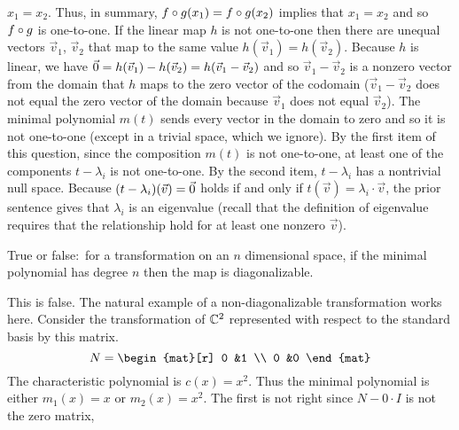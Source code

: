 \begin{exercises}
\begin{answer}
\begin{exparts}
          $x_1=x_2$.
          Thus, in summary, $f\mathbin{\circ} g(x_1)=f\mathbin{\circ} g(x_2)$
          implies that $x_1=x_2$ and so $f\mathbin{\circ} g$ is one-to-one.
        \partsitem If the linear map $h$ 
          is not one-to-one then there are unequal
          vectors $\vec{v}_1$, $\vec{v}_2$ that map to the same value
          $h(\vec{v}_1)=h(\vec{v}_2)$.
          Because $h$ is linear, we have
          $\vec{0}=h(\vec{v}_1)-h(\vec{v}_2)=h(\vec{v}_1-\vec{v}_2)$
          and so $\vec{v}_1-\vec{v}_2$ is a nonzero vector from the domain
          that $h$ maps to the zero vector of the codomain  
          ($\vec{v}_1-\vec{v}_2$
          does not equal the zero vector of the domain because $\vec{v}_1$
          does not equal $\vec{v}_2$).
        \partsitem The minimal polynomial 
          $m(t)$ sends every vector in the domain to 
          zero and so it is not one-to-one (except in a trivial space, which 
          we ignore).
          By the first item of this question, 
          since the composition $m(t)$ is not one-to-one, 
          at least one of the components $t-\lambda_i$ is not one-to-one.
          By the second item, $t-\lambda_i$ has a nontrivial null space.
          Because $(t-\lambda_i)(\vec{v})=\vec{0}$ holds if and only if
          $t(\vec{v})=\lambda_i\cdot\vec{v}$, the prior sentence gives that
          $\lambda_i$ is an eigenvalue (recall that the definition of
          eigenvalue requires that the relationship hold for at least one
          nonzero $\vec{v}$).
      \end{exparts}
    \end{answer}
  \item 
    True or false:~for a transformation on an
    \( n \) dimensional space, if the minimal polynomial has degree \( n \) 
    then the map is diagonalizable.
    \begin{answer}
      This is false.
      The natural example of a non-diagonalizable transformation works here.
      Consider the transformation of $\mathbb{C}^2$ represented with respect to
      the standard basis by this matrix.
      \begin{equation*}
        N=
        \begin{mat}[r]
          0  &1  \\
          0  &0
        \end{mat}
      \end{equation*}
      The characteristic polynomial is $c(x)=x^2$. 
      Thus the minimal polynomial is either $m_1(x)=x$ or $m_2(x)=x^2$.
      The first is not right since $N-0\cdot I$ is not the zero matrix,

\end{answer}
\end{exercises}
